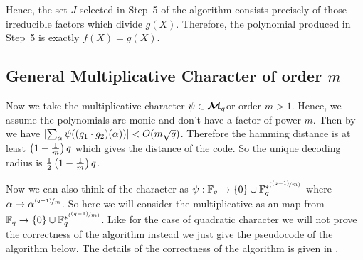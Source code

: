 Hence, the set $J$ selected in Step~5 of the algorithm consists precisely of those irreducible factors which divide $g(X)$. Therefore, the polynomial produced in Step~5 is exactly $f(X)=g(X)$. 



\subsection{General Multiplicative Character of order \texorpdfstring{$m$}{m}}

Now we take the multiplicative character $\psi\in\boldsymbol{\mathcal{M}}_q$or order $m>1$. Hence, we assume the polynomials are monic and don't have a factor of power $m$. Then by \WeilBoundPsiNondthm we have $\left|\sum_{\alpha}\psi((g_1\cdot g_2)(\alpha))\right|< O(m\sqrt{q})$. Therefore the hamming distance is at least $\left(1-\frac1m\right)q$ which gives the distance of the code. So the unique decoding radius is $\frac12\left(1-\frac1m\right)q$.

Now we can also think of the character as $\psi:\mathbb{F}_q\to \{0\}\cup\mathbb{F}_q^{*^{(\nicefrac{(q-1)}m)}}$ where $\alpha\mapsto \alpha^{\nicefrac{(q-1)}m}$. So here we will consider the multiplicative as an map from $\mathbb{F}_q\to \{0\}\cup\mathbb{F}_q^{*^{(\nicefrac{(q-1)}m)}}$. Like for the case of quadratic character we will not prove the correctness of the algorithm instead we just give the pseudocode of the algorithm below. The details of the correctness of the algorithm is given in \cite{Kopparty2026}.


\begin{algorithm}
  \DontPrintSemicolon
  \caption{Decoding from $\nicefrac1{12}-$th of distance of $m^{th}$-order Character Evaluation}
\end{algorithm}
